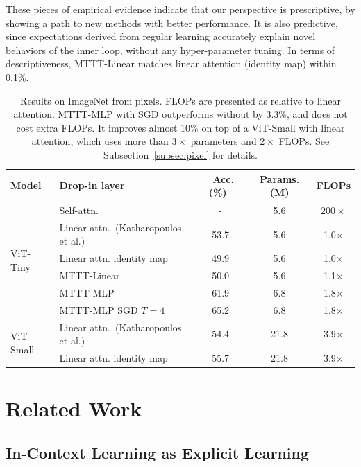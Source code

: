 \documentclass{article}
\begin{document}
These pieces of empirical evidence indicate that our perspective is prescriptive, by showing a path to new methods with better performance. 
It is also predictive, since expectations derived from regular learning accurately explain novel behaviors of the inner loop, without any hyper-parameter tuning.
In terms of descriptiveness, MTTT-Linear matches linear attention (identity map) within 0.1\%.

\begin{table}
\vspace{-1ex}
\centering
\begin{tabular}{|l|l|c|c|c|}
\toprule
Model
& Drop-in layer
& ~Acc. (\%)~
& {\footnotesize Params. (M)}
& {\small FLOPs}
\\
\midrule
\multirow{6}{*}{\parbox{1cm}{ViT-Tiny}} 
& Self-attn.~{\tiny \citep{beyer2022better}} 
& - & 5.6 & $200\times$ \\
& Linear attn.~{\tiny (Katharopoulos et al.)}
& 53.7 & 5.6 & 1.0$\times$ \\
& Linear attn. identity map
& 49.9 & 5.6 & 1.0$\times$ \\
\cmidrule(lr){2-5}
& MTTT-Linear 
& 50.0 & 5.6 & 1.1$\times$ \\
& MTTT-MLP
& 61.9 & 6.8 & 1.8$\times$ \\
& MTTT-MLP SGD $T=4$
& 65.2 & 6.8 & 1.8$\times$ \\
\midrule
\multirow{2}{*}{\parbox{1cm}{ViT-Small}} 
& Linear attn.~{\tiny (Katharopoulos et al.)}
& 54.4 & 21.8 & 3.9$\times$ \\
& Linear attn. identity map
& 55.7 & 21.8 & 3.9$\times$ \\
\bottomrule
\end{tabular}
\caption{
Results on ImageNet from pixels. FLOPs are presented as relative to linear attention.
MTTT-MLP with SGD outperforms without by 3.3\%, and does not cost extra FLOPs.
It improves almost 10\% on top of a ViT-Small with linear attention, which uses more than $3\times$ parameters and $2\times$ FLOPs.
See Subsection~\ref{subsec:pixel} for details.
}
\vspace{-1ex}
\label{tab:pixel}
\end{table}

\section{Related Work}
\label{sec:rel}

\subsection{In-Context Learning as Explicit Learning}
\label{subsec:rel-inc}
\end{document}
